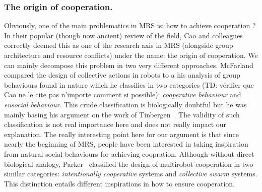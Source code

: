 
    \subsubsection{The origin of cooperation.} Obviously, one of the main problematics in MRS is: how to achieve cooperation ? In their popular (though now ancient) review of the field, Cao and colleagues~\cite{Cao1997} correctly deemed this as one of the research axis in MRS (alongside group architecture and resource conflicts) under the name: the origin of cooperation. We can mainly decompose this problem in two very different approaches. McFarland~\cite{McFarland1996} compared the design of collective actions in robots to a his analysis of group behaviours found in nature which he classifies in two categories (TD: vérifier que Cao ne le cite pas n'importe comment si possible): \emph{cooperative behaviour} and \emph{eusocial behaviour}. This crude classification is biologically doubtful but he was mainly basing his argument on the work of Tinbergen~\cite{Tinbergen1953}. The validity of such classification is not real importance here and does not really impact our explanation. The really interesting point here for our argument is that since nearly the beginning of MRS, people have been interested in taking inspiration from natural social behaviours for achieving coopration. Although without direct biological analogy, Parker~\cite{Parker2008} classified the design of multirobot cooperation in two similar categories: \emph{intentionally cooperative} systems and \emph{collective swarm} systems. This distinction entails different inspirations in how to ensure cooperation.

